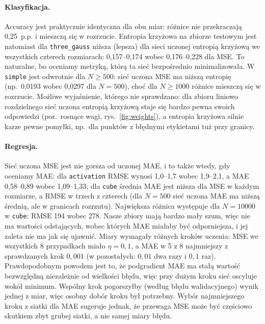 \documentclass[11pt,a4paper]{article}
\begin{document}
	\paragraph{Klasyfikacja.} Accuracy jest praktycznie identyczna dla obu miar: różnice nie przekraczają 0,25~p.p. i mieszczą się w rozrzucie. Entropia krzyżowa na zbiorze testowym jest natomiast dla \texttt{three\_gauss} niższa (lepsza) dla sieci uczonej entropią krzyżową we wszystkich czterech rozmiarach: 0,157--0,174 wobec 0,176--0,228 dla MSE. To naturalne, bo oceniamy metryką, którą ta sieć bezpośrednio minimalizowała. W \texttt{simple} jest odwrotnie dla $N\ge500$: sieć uczona MSE ma niższą entropię (np.\ 0,0193 wobec 0,0297 dla $N=500$), choć dla $N\ge1000$ różnice mieszczą się w rozrzucie. Możliwe wyjaśnienie, którego nie sprawdzano: dla zbioru liniowo rozdzielnego sieć uczona entropią krzyżową staje się bardzo pewna swoich odpowiedzi (por.\ rosnące wagi, rys.~\ref{fig:weights}), a entropia krzyżowa silnie karze pewne pomyłki, np.\ dla punktów z błędnymi etykietami tuż przy granicy.
	
	\paragraph{Regresja.} Sieć uczona MSE jest nie gorsza od uczonej MAE, i to także wtedy, gdy oceniamy MAE: dla \texttt{activation} RMSE wynosi 1,0--1,7 wobec 1,9--2,1, a MAE 0,58--0,89 wobec 1,09--1,33; dla \texttt{cube} średnia MAE jest niższa dla MSE w każdym rozmiarze, a RMSE w trzech z czterech (dla $N=500$ sieć uczona MAE ma niższą średnią, ale w granicach rozrzutu). Największa różnica występuje dla $N=10000$ w \texttt{cube}: RMSE 194 wobec 278. Nasze zbiory mają bardzo mały szum, więc nie ma wartości odstających, wobec których MAE miałaby być odporniejsza, i jej zaleta nie ma jak się ujawnić.
	Miary wymagały różnych kroków uczenia: MSE we wszystkich 8 przypadkach miało $\eta=0{,}1$, a MAE w 5 z 8 najmniejszy z sprawdzanych krok $0{,}001$ (w pozostałych: $0{,}01$ dwa razy i $0{,}1$ raz). Prawdopodobnym powodem jest to, że podgradient MAE ma stałą wartość bezwzględną niezależnie od wielkości błędu, więc przy dużym kroku sieć oscyluje wokół minimum. Wspólny krok pogorszyłby (według błędu walidacyjnego) wynik jednej z miar, więc osobny dobór kroku był potrzebny. Wybór najmniejszego kroku z siatki dla MAE sugeruje jednak, że przewaga MSE może być częściowo skutkiem zbyt grubej siatki, a nie samej miary błędu.
	
\end{document}
